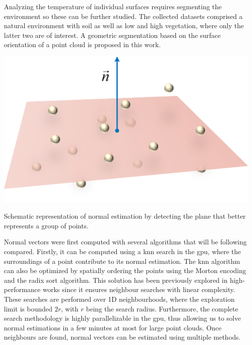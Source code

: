 Analyzing the temperature of individual surfaces requires segmenting the environment so these can be further studied. The collected datasets comprised a natural environment with soil as well as low and high vegetation, where only the latter two are of interest. A geometric segmentation based on the surface orientation of a point cloud is proposed in this work.

\begin{marginfigure}[1cm]
	\includegraphics{figs/thermal_projection/plane_fitting.png}
	\caption{Schematic representation of normal estimation by detecting the plane that better represents a group of points.}
	\label{fig:plane_fitting}
\end{marginfigure}
Normal vectors were first computed with several algorithms that will be following compared. Firstly, it can be computed using a \acrshort{knn} search in the \acrshort{gpu}, where the surroundings of a point contribute to its normal estimation. The \acrshort{knn} algorithm can also be optimized by spatially ordering the points using the Morton encoding and the radix sort algorithm. This solution has been previously explored in high-performance works \cite{jakob_optimizing_2021} since it ensures neighbour searches with linear complexity. These searches are performed over 1D neighbourhoods, where the exploration limit is bounded $2r$, with $r$ being the search radius. Furthermore, the complete search methodology is highly parallelizable in the \acrshort{gpu}, thus allowing us to solve normal estimations in a few minutes at most for large point clouds. Once neighbours are found, normal vectors can be estimated using multiple methods.
